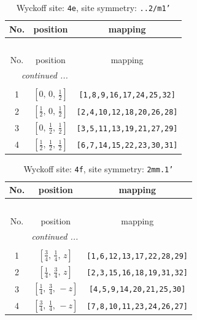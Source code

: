 \documentclass[fleqn,8pt]{jsarticle}
\begin{document}
\renewcommand{\arraystretch}{1.2}
\begin{longtable}{ccc}
\caption{Wyckoff site: {\tt 4e}, site symmetry: {\tt ..2/m1'}}
 \\
 \hline \hline
No. & position & mapping \\ \hline \endfirsthead

\multicolumn{2}{l}{\tablename\ \thetable{}} \\
 \hline \hline
No. & position & mapping \\ \hline \endhead

 \hline \hline
\multicolumn{2}{r}{\footnotesize\it continued ...} \\ \endfoot

 \hline \hline
\multicolumn{2}{r}{} \\ \endlastfoot

1 & $\left[ 0,\, 0,\, \frac{1}{2} \right]$ & {\tt [1,8,9,16,17,24,25,32]} \\ \hline
2 & $\left[ \frac{1}{2},\, 0,\, \frac{1}{2} \right]$ & {\tt [2,4,10,12,18,20,26,28]} \\ \hline
3 & $\left[ 0,\, \frac{1}{2},\, \frac{1}{2} \right]$ & {\tt [3,5,11,13,19,21,27,29]} \\ \hline
4 & $\left[ \frac{1}{2},\, \frac{1}{2},\, \frac{1}{2} \right]$ & {\tt [6,7,14,15,22,23,30,31]} \\
\end{longtable}
\renewcommand{\arraystretch}{1.2}
\begin{longtable}{ccc}
\caption{Wyckoff site: {\tt 4f}, site symmetry: {\tt 2mm.1'}}
 \\
 \hline \hline
No. & position & mapping \\ \hline \endfirsthead

\multicolumn{2}{l}{\tablename\ \thetable{}} \\
 \hline \hline
No. & position & mapping \\ \hline \endhead

 \hline \hline
\multicolumn{2}{r}{\footnotesize\it continued ...} \\ \endfoot

 \hline \hline
\multicolumn{2}{r}{} \\ \endlastfoot

1 & $\left[ \frac{3}{4},\, \frac{1}{4},\, z \right]$ & {\tt [1,6,12,13,17,22,28,29]} \\ \hline
2 & $\left[ \frac{1}{4},\, \frac{3}{4},\, z \right]$ & {\tt [2,3,15,16,18,19,31,32]} \\ \hline
3 & $\left[ \frac{1}{4},\, \frac{3}{4},\, - z \right]$ & {\tt [4,5,9,14,20,21,25,30]} \\ \hline
4 & $\left[ \frac{3}{4},\, \frac{1}{4},\, - z \right]$ & {\tt [7,8,10,11,23,24,26,27]} \\
\end{longtable}
\end{document}
